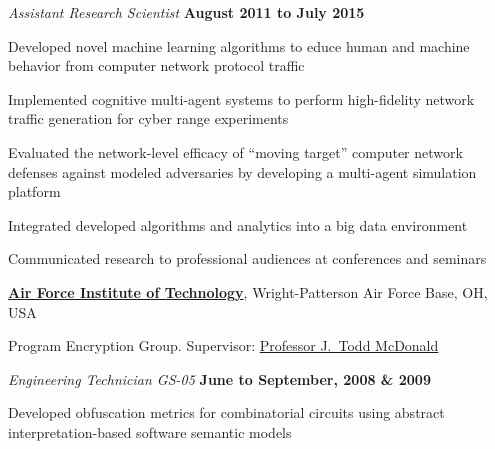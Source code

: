 \documentclass[10pt]{article}
\newcommand{\halfblankline}{\quad\vspace{-0.5\baselineskip}\pagebreak[3]}
\begin{document}
\begin{outerlist}

\item[] \textit{Assistant Research Scientist}%
\hfill \textbf{August 2011 to July 2015}

\begin{innerlist}

\item Developed novel machine learning algorithms to educe human and machine behavior from computer network protocol traffic

\item Implemented cognitive multi-agent systems to perform high-fidelity network traffic generation for cyber range experiments

\item Evaluated the network-level efficacy of ``moving target'' computer network defenses against modeled adversaries by developing a multi-agent simulation platform

\item Integrated developed algorithms and analytics into a big data environment

\item Communicated research to professional audiences at conferences and seminars

\end{innerlist}
\end{outerlist}

\halfblankline

\href{http://www.ll.mit.edu/}{\textbf{Air Force Institute of Technology}},
Wright-Patterson Air Force Base, OH, USA

Program Encryption Group.
Supervisor: 
\href{http://www.soc.southalabama.edu/~mcdonald/}
{Professor J.~Todd McDonald}

\begin{outerlist}

\item[] \textit{Engineering Technician GS-05}%
\hfill \textbf{June to September, 2008 \& 2009}

\begin{innerlist}

\item Developed obfuscation metrics for combinatorial circuits using abstract interpretation-based software semantic models

\end{innerlist}
\end{outerlist}
\end{document}
